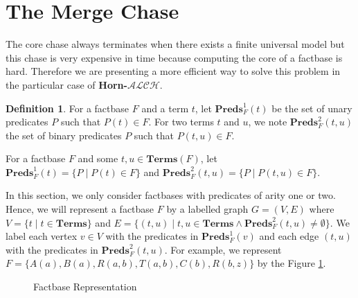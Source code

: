 \documentclass{article}
\theoremstyle{definition}
\newtheorem{definition}{Definition}[section]
\theoremstyle{remark}
\newcommand{\Terms}{\textbf{Terms}}
\newcommand{\Preds}{\textbf{Preds}}
\newcommand{\ALCH}{\textbf{Horn-$\mathcal{ALCH}$}}
\begin{document}
\section{The Merge Chase}

The core chase always terminates when there exists a finite universal model but this chase is very expensive in time because computing the core of a factbase is hard. Therefore we are presenting a more efficient way to solve this problem in the particular case of \ALCH.

\begin{definition}
For a factbase $F$ and a term $t$, let \emph{$\Preds^1_F(t)$} be the set of unary predicates $P$ such that $P(t)\in F$. For two terms $t$ and $u$, we note \emph{$\Preds^2_F(t,u)$} the set of binary predicates $P$ such that $P(t,u)\in F$. 

For a factbase $F$ and some $t, u \in \Terms(F)$, let $\Preds^1_F(t) = \{P \mid P(t) \in F\}$ and $\Preds^2_F(t, u) = \{P \mid P(t, u) \in F\}$.
\end{definition}

In this section, we only consider factbases with predicates of arity one or two. Hence, we will represent a factbase $F$ by a labelled graph $G = (V,E)$ where $V = \{t \mid t \in \Terms \}$ and $E = \{(t,u) \mid t,u \in \Terms \wedge \Preds_F^2(t,u) \neq \emptyset\}$. We label each vertex $v \in V$ with the predicates in $\Preds_F^1(v)$ and each edge $(t, u)$ with the predicates in $\Preds^2_F(t, u)$. For example, we represent $F = \{A(a), B(a),R(a,b),T(a,b),C(b),R(b,z)\}$ by the Figure \ref{figure:graph}.

\begin{figure}
\begin{center}
\end{center}

\caption{Factbase Representation}
\label{figure:graph}
\end{figure}
\end{document}
